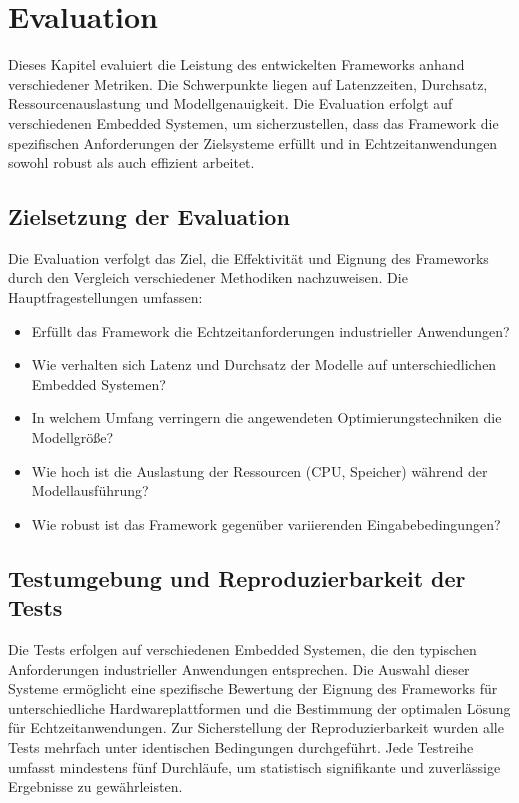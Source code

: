 \chapter{Evaluation}
\label{chap:evaluation}

Dieses Kapitel evaluiert die Leistung des entwickelten Frameworks anhand verschiedener Metriken. 
Die Schwerpunkte liegen auf Latenzzeiten, Durchsatz, Ressourcenauslastung und Modellgenauigkeit. 
Die Evaluation erfolgt auf verschiedenen Embedded Systemen, um sicherzustellen, dass das Framework 
die spezifischen Anforderungen der Zielsysteme erfüllt und in Echtzeitanwendungen sowohl robust als auch effizient arbeitet.

\section{Zielsetzung der Evaluation}

Die Evaluation verfolgt das Ziel, die Effektivität und Eignung des Frameworks durch den Vergleich verschiedener 
Methodiken nachzuweisen. Die Hauptfragestellungen umfassen:
\begin{itemize}
    \item Erfüllt das Framework die Echtzeitanforderungen industrieller Anwendungen?
    \item Wie verhalten sich Latenz und Durchsatz der Modelle auf unterschiedlichen Embedded Systemen?
    \item In welchem Umfang verringern die angewendeten Optimierungstechniken die Modellgröße?
    \item Wie hoch ist die Auslastung der Ressourcen (CPU, Speicher) während der Modellausführung?
    \item Wie robust ist das Framework gegenüber variierenden Eingabebedingungen?
\end{itemize}

\section{Testumgebung und Reproduzierbarkeit der Tests}

Die Tests erfolgen auf verschiedenen Embedded Systemen, die den typischen Anforderungen industrieller 
Anwendungen entsprechen. Die Auswahl dieser Systeme ermöglicht eine spezifische Bewertung der 
Eignung des Frameworks für unterschiedliche Hardwareplattformen und die Bestimmung der optimalen Lösung für Echtzeitanwendungen. 
Zur Sicherstellung der Reproduzierbarkeit wurden alle Tests mehrfach unter identischen Bedingungen durchgeführt. 
Jede Testreihe umfasst mindestens fünf Durchläufe, um statistisch signifikante und zuverlässige Ergebnisse zu gewährleisten.

